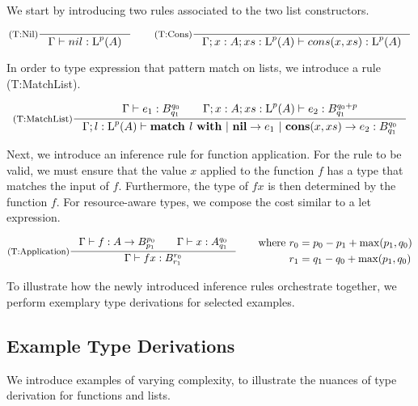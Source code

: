 We start by introducing two rules associated to the two list constructors. 

\[
   \inference[(T:Nil)]
   {}
   {\typing{\Gamma}{nil}{\ralist{p}{A}}}
   \qquad
   \inference[(T:Cons)]
   {}
   {\typing{\Gamma;x : A; xs : \ralist{p}{A}}{cons(x, xs)}{\ralist{p}{A}}}
\]

In order to type expression that pattern match on lists, we introduce a rule (T:MatchList). 

\[
   \inference[(T:MatchList)]
   {\typing{\Gamma}{e_1}{\ratype{B}{q_0}{q_1}} \qquad \typing{\Gamma;x : A; xs : \ralist{p}{A}}{e_2}{\ratype{B}{q_0 + p}{q_1}}}
   {\typing{\Gamma;l : \ralist{p}{A}}{\listmatch{l}{e_1}{e_2}}{\ratype{B}{q_0}{q_1}}}
\]

Next, we introduce an inference rule for function application. For the rule to be valid, we must ensure that the value \(x\) applied to the function \(f\) has a type that matches the input of \(f\). Furthermore, the type of \(f x\) is then determined by the function \(f\). For resource-aware types, we compose the cost similar to a let expression. 

\[
   \inference[(T:Application)]
   {\typing{\Gamma}{f}{\rafunc{A}{B}{p_0}{p_1}} \qquad \typing{\Gamma}{x}{\ratype{A}{q_0}{q_1}}}
   {\typing{\Gamma}{f x}{\ratype{B}{r_0}{r_1}}}
   \qquad
   \begin{aligned}
      \text{where }  & r_0 = p_0 - p_1 + \max(p_1, q_0)\\
                     & r_1 = q_1 - q_0 + \max(p_1, q_0)
   \end{aligned}
\]


To illustrate how the newly introduced inference rules orchestrate together, we perform exemplary type derivations for selected examples.

\subsection{Example Type Derivations}

We introduce examples of varying complexity, to illustrate the nuances of type derivation for functions and lists. 


